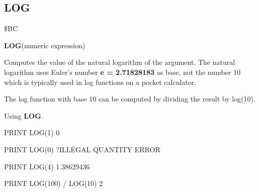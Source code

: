 
\newpage
\subsection{LOG}
\begin{description}[leftmargin=3cm,style=nextline]
\item [Token:] \$BC
\item [Format:] {\bf LOG}(numeric expression)
\item [Usage:] Computes
               the value of the natural logarithm of the argument.
               The natural logarithm uses
               Euler's number {\bf e = 2.71828183} as base,
               not the number 10 which is typically used
               in log functions on a pocket calculator.

\item [Remarks:] The log function with base 10 can be computed
                 by dividing the result by log(10).
\item [Example:] Using {\bf LOG}
\begin{screenoutput}
PRINT LOG(1)
 0

PRINT LOG(0)
 ?ILLEGAL QUANTITY ERROR

PRINT LOG(4)
 1.38629436

PRINT LOG(100) / LOG(10)
 2
\end{screenoutput}
\end{description}


\newpage

